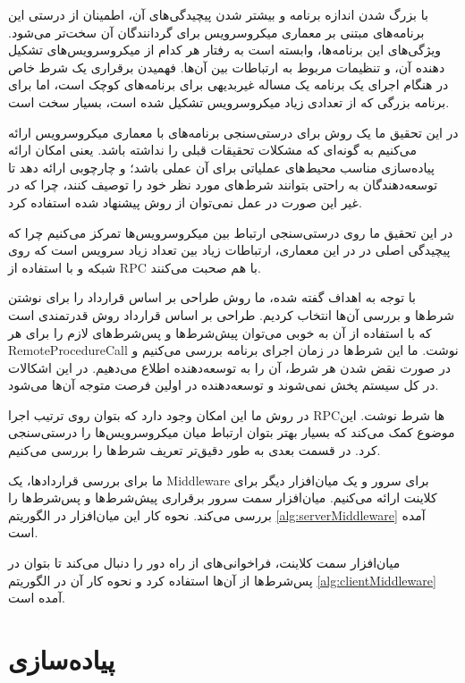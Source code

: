 با بزرگ شدن اندازه برنامه و بیشتر شدن پیچیدگی‌های آن، اطمینان از درستی این برنامه‌های مبتنی بر معماری میکروسرویس برای گردانندگان آن سخت‌تر می‌شود. ویژگی‌های این برنامه‌ها، وابسته است به رفتار هر کدام از میکروسرویس‌های تشکیل دهنده آن، و تنظیمات مربوط به ارتباطات بین آن‌ها. فهمیدن برقراری یک شرط خاص در هنگام اجرای یک برنامه یک مساله غیربدیهی برای برنامه‌های کوچک است، اما برای برنامه بزرگی که از تعدادی زیاد میکروسرویس تشکیل شده است، بسیار سخت است.

در این تحقیق ما یک روش برای درستی‌سنجی برنامه‌های با معماری میکروسرویس ارائه می‌کنیم به گونه‌ای که مشکلات تحقیقات قبلی را نداشته باشد. یعنی امکان ارائه پیاده‌سازی مناسب محیط‌های عملیاتی برای آن عملی باشد؛ و چارچوبی ارائه دهد تا توسعه‌دهندگان به راحتی بتوانند شرط‌های مورد نظر خود را توصیف کنند، چرا که در غیر این صورت در عمل نمی‌توان از روش پیشنهاد شده استفاده کرد.

در این تحقیق ما روی درستی‌سنجی ارتباط بین میکروسرویس‌ها تمرکز می‌کنیم چرا که پیچیدگی اصلی در در این معماری، ارتباطات زیاد بین تعداد زیاد سرویس است که روی شبکه و با استفاده از
\gls{RPC}
با هم صحبت می‌کنند.

با توجه به اهداف گفته شده، ما روش طراحی بر اساس قرارداد را برای نوشتن شرط‌ها و بررسی آن‌ها انتخاب کردیم. طراحی بر اساس قرارداد روش قدرتمندی است که با استفاده از آن به خوبی می‌توان پیش‌شرط‌ها و پس‌شرط‌های لازم را برای هر
\gls{RemoteProcedureCall}
نوشت. ما این شرط‌ها در زمان اجرای برنامه بررسی می‌کنیم و در صورت نقض شدن هر شرط، آن را به توسعه‌دهنده اطلاع می‌دهیم. در این اشکالات در کل سیستم پخش نمی‌شوند و توسعه‌دهنده در اولین فرصت متوجه آن‌ها می‌شود.

در روش ما این امکان وجود دارد که بتوان روی ترتیب اجرا
\gls{RPC}ها
شرط نوشت. این موضوع کمک می‌کند که بسیار بهتر بتوان ارتباط میان میکروسرویس‌ها را درستی‌سنجی کرد. در قسمت بعدی به طور دقیق‌تر تعریف شرط‌ها را بررسی می‌کنیم. 

ما برای بررسی قراردادها، یک
\gls{Middleware}
برای سرور و یک میان‌افزار دیگر برای کلاینت ارائه می‌کنیم. میان‌افزار سمت سرور برقراری پیش‌شرط‌ها و پس‌شرط‌ها را بررسی می‌کند. نحوه کار این میان‌افزار در الگوریتم
\ref{alg:serverMiddleware}
آمده است.

میان‌افزار سمت کلاینت، فراخوانی‌های از راه‌ دور را دنبال می‌کند تا بتوان در پس‌شرط‌ها از آن‌ها استفاده کرد و نحوه کار آن در الگوریتم
\ref{alg:clientMiddleware}
آمده است.


\section{پیاده‌سازی}

